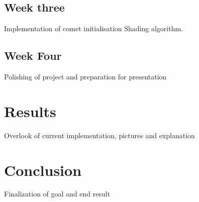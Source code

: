 \documentclass[a4paper,11pt]{article}
\begin{document}
\subsection{Week three}
Implementation of comet initialisation
Shading algorithm.

\subsection{Week Four}
Polishing of project and preparation for presentation
\section{Results}
Overlook of current implementation, pictures and explanation
\section{Conclusion}
Finalization of goal and end result
\end{document}
